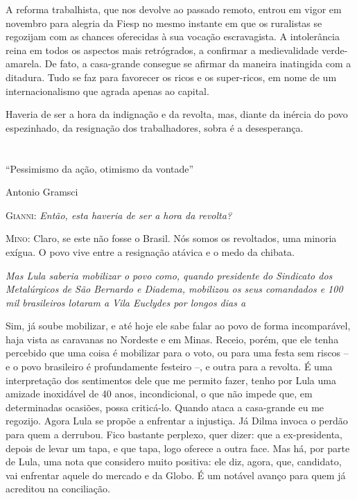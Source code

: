 A reforma trabalhista, que nos devolve ao passado remoto, entrou em
vigor em novembro para alegria da Fiesp no mesmo instante em que os
ruralistas se regozijam com as chances oferecidas à sua vocação
escravagista. A intolerância reina em todos os aspectos mais
retrógrados, a confirmar a medievalidade verde-amarela. De fato, a
casa-grande consegue se afirmar da maneira inatingida com a ditadura.
Tudo se faz para favorecer os ricos e os super-ricos, em nome de um
internacionalismo que agrada apenas ao capital.

Haveria de ser a hora da indignação e da revolta, mas, diante da inércia
do povo espezinhado, da resignação dos trabalhadores, sobra é a
desesperança.



\chapter*{}

\epigraph{``Pessimismo da ação, otimismo da vontade''}{Antonio Gramsci}


\parindent0pt
\parskip4pt

\textsc{Gianni:}
\itshape
 Então, esta haveria de ser a hora da revolta?

\normalfont\textsc{Mino:} Claro, se este não fosse o Brasil. Nós somos os
revoltados, uma minoria exígua. O povo vive entre a resignação atávica e
o medo da chibata.

\itshape
Mas Lula saberia mobilizar o povo como, quando
presidente do Sindicato dos Metalúrgicos de São Bernardo e Diadema,
mobilizou os seus comandados e 100 mil brasileiros lotaram a Vila
Euclydes por longos dias a%

\normalfont 
\normalfont
Sim, já soube mobilizar, e até hoje ele sabe falar ao
povo de forma incomparável, haja vista as caravanas no Nordeste e em
Minas. Receio, porém, que ele tenha percebido que uma coisa é mobilizar
para o voto, ou para uma festa sem riscos -- e o povo brasileiro é
profundamente festeiro --, e outra para a revolta. É uma interpretação
dos sentimentos dele que me permito fazer, tenho por Lula uma amizade
inoxidável de 40 anos, incondicional, o que não impede que, em
determinadas ocasiões, possa criticá-lo. Quando ataca a casa-grande eu
me regozijo. Agora Lula se propõe a enfrentar a injustiça. Já Dilma
invoca o perdão para quem a derrubou. Fico bastante perplexo, quer
dizer: que a ex-presidenta, depois de levar um tapa, e que tapa, logo
oferece a outra face. Mas há, por parte de Lula, uma nota que considero
muito positiva: ele diz, agora, que, candidato, vai enfrentar aquele do
mercado e da Globo. É um notável avanço para quem já acreditou na
conciliação.

